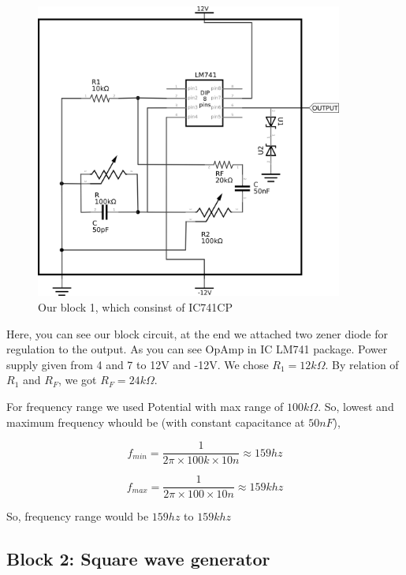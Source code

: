 \documentclass{article}
\begin{document}
\begin{figure}[ht]
    \centering
    \label{sinereal}
    \includegraphics[width=0.9\textwidth]{imgs/sinereal.png}
    \caption{Our block 1, which consinst of IC741CP}
\end{figure}


Here, you can see our block circuit, at the end we attached two zener diode for regulation to the output. As you can see OpAmp in IC LM741 package. Power supply given from  4 and 7 to 12V and -12V. We chose \(R_{1}=12k\Omega\). By relation of \(R_{1}\) and \(R_{F}\), we got \(R_{F}=24k\Omega\).

For frequency range we used Potential with max range of \(100k\Omega\). So, lowest and maximum frequency whould be (with constant capacitance at \(50nF\)),

\begin{equation*}
\label{eq:orga466ec1}
  f_{min} = \frac{1}{2\pi\times100k\times 10n} \approx 159 hz
\end{equation*}

\begin{equation*}
\label{eq:orgfba4eff}
  f_{max} = \frac{1}{2\pi\times100\times 10n} \approx 159k hz
\end{equation*}

So, frequency range would be \(159 hz\) to \(159k hz\)


\subsection{Block 2: Square wave generator}
\label{sec:org4767e83}
\end{document}

